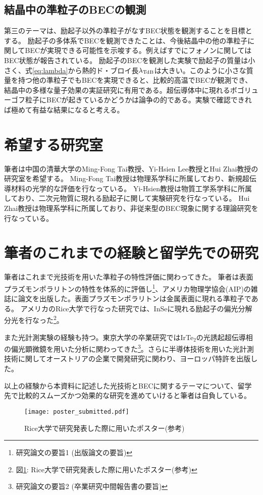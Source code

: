 \documentclass[11pt,a4paper]{jsarticle}
\begin{document}
\subsection{結晶中の準粒子のBECの観測}
第三のテーマは、励起子以外の準粒子がなすBEC状態を観測することを目標とする。
励起子の多体系でBECを観測できたことは、今後結晶中の他の準粒子に関してBECが実現できる可能性を示唆する。例えばすでにフォノンに関してはBEC状態が報告されている\cite{Misochko}。
励起子のBECを観測した実験で励起子の質量は小さく、式\ref{eq:lambda}から熱的ド・ブロイ長$\lambda_{\rm TdB}$は大きい。このように小さな質量を持つ他の準粒子でもBECを実現できると、比較的高温でBECが観測でき、結晶中の多様な量子効果の実証研究に有用である。超伝導体中に現れるボゴリューゴフ粒子にBECが起きているかどうかは論争の的である。実験で確認できれば極めて有益な結果になると考える。

\section{希望する研究室}
筆者は中国の清華大学のMing-Fong Tai教授、Yi-Hsien Lee教授とHui Zhai教授の研究室を希望する。
Ming-Fong Tai教授は物理系学科に所属しており、新規超伝導材料の光学的な評価を行なっている\cite{Chang2}。
Yi-Hsien教授は物質工学系学科に所属しており、二次元物質に現れる励起子に関して実験研究を行なっている\cite{Mahmood}。
Hui Zhai教授は物理系学科に所属しており、非従来型のBEC現象に関する理論研究を行なっている\cite{Wang}。

\section{筆者のこれまでの経験と留学先での研究}
筆者はこれまで光技術を用いた準粒子の特性評価に関わってきた。
筆者は表面プラズモンポラリトンの特性を体系的に評価し\footnote{研究論文の要旨1 (出版論文の要旨)}、アメリカ物理学協会(AIP)の雑誌に論文を出版した\cite{Hiramatsu}。表面プラズモンポラリトンは金属表面に現れる準粒子である。
アメリカのRice大学で行なった研究では、InSeに現れる励起子の偏光分解分光を行なった\footnote{ 図\ref{fig:poster}: Rice大学で研究発表した際に用いたポスター(参考)}。

また光計測実験の経験も持つ。東京大学の卒業研究ではIrTe$_2$の光誘起超伝導相の偏光顕微鏡を用いた分析に関わってきた\footnote{研究論文の要旨2 (卒業研究中間報告書の要旨)}。さらに半導体技術を用いた光計測技術に関してオーストリアの企業で開発研究に関わり、ヨーロッパ特許を出版した\cite{Etschmaier}。

以上の経験から本資料に記述した光技術とBECに関するテーマについて、留学先で比較的スムーズかつ効果的な研究を進めていけると筆者は自負している。




\begin{figure}[p]
  \begin{center}
   \texttt{[image: poster\_submitted.pdf]}
  \end{center}
  \caption{Rice大学で研究発表した際に用いたポスター(参考)}
  \label{fig:poster}
\end{figure}
\end{document}
